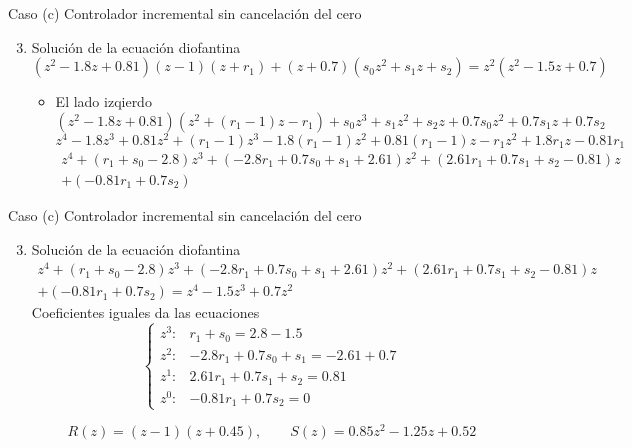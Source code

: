 \documentclass[presentation,aspectratio=169]{beamer}
\begin{document}
\begin{frame}[label={sec:org2e7a89c}]{Caso (c) Controlador incremental sin cancelación del cero}
\begin{enumerate}
\setcounter{enumi}{2}
\item \alert{Solución de la ecuación diofantina} 
\[(z^2 - 1.8z + 0.81)(z-1)(z+r_1) + (z+0.7)(s_0z^2 + s_1z + s_2) = z^2(z^2-1.5z+0.7) \]
\begin{itemize}
\item El lado izqierdo
\[(z^2 - 1.8z + 0.81)(z^2 +(r_1-1)z - r_1) + s_0z^3 + s_1z^2 + s_2z + 0.7s_0z^2 + 0.7s_1z + 0.7s_2\] 
\[z^4 - 1.8z^3 + 0.81z^2 + (r_1-1)z^3 - 1.8(r_1-1)z^2 + 0.81(r_1-1)z - r_1z^2 + 1.8r_1z - 0.81r_1 \]
\begin{multline*}
z^4 + (r_1 + s_0 -2.8)z^3 + (-2.8r_1 + 0.7s_0 + s_1 +2.61)z^2 + (2.61 r_1 + 0.7s_1 + s_2 -0.81)z\\   + (-0.81r_1 + 0.7s_2)\end{multline*}
\end{itemize}
\end{enumerate}
\end{frame}

\begin{frame}[label={sec:org57efeb6}]{Caso (c) Controlador incremental sin cancelación del cero}
\begin{enumerate}
\setcounter{enumi}{2}
\item \alert{Solución de la ecuación diofantina} 
\begin{multline*}
  z^4 + (r_1 + s_0 -2.8)z^3 + (-2.8r_1 + 0.7s_0 + s_1 +2.61)z^2 + (2.61 r_1 + 0.7s_1 + s_2 -0.81)z\\   + (-0.81r_1 + 0.7s_2) = z^4 -1.5z^3 + 0.7z^2\end{multline*} 
Coeficientes iguales da las ecuaciones
\[ \begin{cases} z^3: & r_1 + s_0 = 2.8 -1.5\\
              z^2: & -2.8 r_1 + 0.7s_0 + s_1 = -2.61 +0.7\\
              z^1: &  2.61r_1 + 0.7s_1 + s_2 = 0.81\\
              z^0: & -0.81r_1 + 0.7s_2 = 0  \end{cases} \]

\alert{\[ R(z) = (z-1)(z + 0.45), \qquad S(z) = 0.85z^2 - 1.25z + 0.52\]}
\end{enumerate}
\end{frame}
\end{document}
